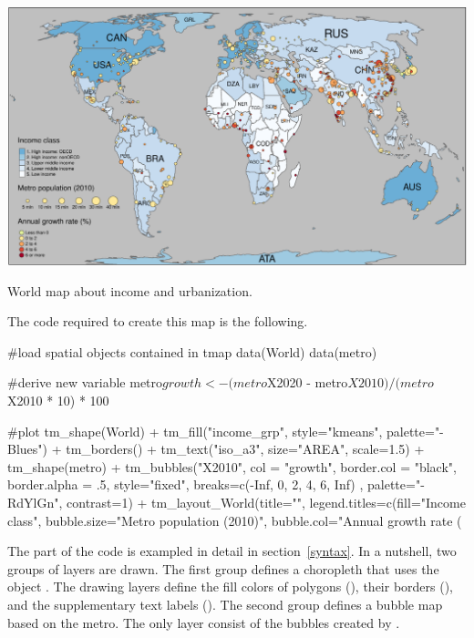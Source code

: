 \begin{widefigure}[htbp]
  \centering
  \includegraphics{bubbleMap2}
  \caption{World map about income and urbanization.}
  \label{figure:bubblemap}
\end{widefigure}

The code required to create this map is the following.

\begin{example}
#load spatial objects contained in tmap
data(World)
data(metro)

#derive new variable
metro$growth <- (metro$X2020 - metro$X2010) / (metro$X2010 * 10) * 100

#plot
tm_shape(World) +
  tm_fill("income_grp", style="kmeans", palette="-Blues") +
  tm_borders() +
  tm_text("iso_a3", size="AREA", scale=1.5) +
tm_shape(metro) +
  tm_bubbles("X2010", col = "growth", border.col = "black", 
    border.alpha = .5, style="fixed", breaks=c(-Inf, 0, 2, 4, 6, Inf) ,
    palette="-RdYlGn", contrast=1) + 
tm_layout_World(title="", legend.titles=c(fill="Income class", 
  bubble.size="Metro population (2010)", bubble.col="Annual growth rate (%
\end{example}

The  part of the code is exampled in detail in section~\ref{syntax}. In a nutshell, two groups of layers are drawn. The first group defines a choropleth that uses the  object . The drawing layers define the fill colors of polygons (), their borders (), and the supplementary text labels (). The second group defines a bubble map based on the  metro. The only layer consist of the bubbles created by .



